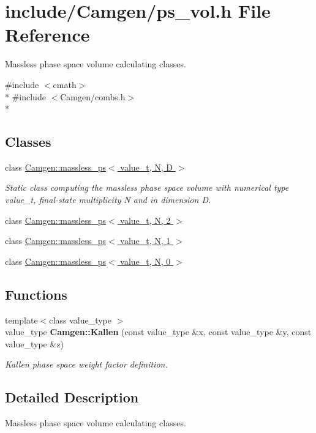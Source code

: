 \hypertarget{a00719}{\section{include/\-Camgen/ps\-\_\-vol.h File Reference}
\label{a00719}
}


Massless phase space volume calculating classes.  


{\ttfamily \#include $<$cmath$>$}\\*
{\ttfamily \#include $<$Camgen/combs.\-h$>$}\\*
\subsection*{Classes}
\begin{DoxyCompactItemize}
\item 
class \hyperlink{a00351}{Camgen\-::massless\-\_\-ps$<$ value\-\_\-t, N, D $>$}
\begin{DoxyCompactList}\small\item\em Static class computing the massless phase space volume with numerical type value\-\_\-t, final-\/state multiplicity N and in dimension D. \end{DoxyCompactList}\item 
class \hyperlink{a00354}{Camgen\-::massless\-\_\-ps$<$ value\-\_\-t, N, 2 $>$}
\item 
class \hyperlink{a00353}{Camgen\-::massless\-\_\-ps$<$ value\-\_\-t, N, 1 $>$}
\item 
class \hyperlink{a00352}{Camgen\-::massless\-\_\-ps$<$ value\-\_\-t, N, 0 $>$}
\end{DoxyCompactItemize}
\subsection*{Functions}
\begin{DoxyCompactItemize}
\item 
\hypertarget{a00849_ae08506689d3478618b163dcb4c4267ea}{{\footnotesize template$<$class value\-\_\-type $>$ }\\value\-\_\-type {\bfseries Camgen\-::\-Kallen} (const value\-\_\-type \&x, const value\-\_\-type \&y, const value\-\_\-type \&z)}\label{a00849_ae08506689d3478618b163dcb4c4267ea}

\begin{DoxyCompactList}\small\item\em Kallen phase space weight factor definition. \end{DoxyCompactList}\end{DoxyCompactItemize}


\subsection{Detailed Description}
Massless phase space volume calculating classes. 